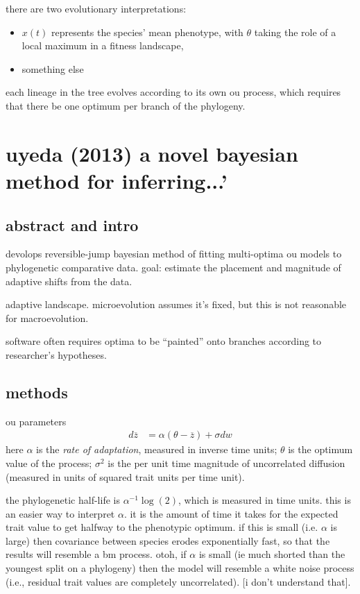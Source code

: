 \documentclass{article}
\begin{document}
there are two evolutionary interpretations:
\begin{itemize}
\item $x(t)$ represents the species' mean phenotype, with $\theta$ taking the role of a local maximum in a fitness landscape, 
\item something else
\end{itemize}
each lineage in the tree evolves according to its own ou process, which requires
that there be one optimum per branch of the phylogeny.



\section{uyeda (2013) a novel bayesian method for inferring...'}

\subsection{abstract and intro}
devolops reversible-jump bayesian method of fitting multi-optima ou models to
phylogenetic comparative data. goal: estimate the placement and magnitude of
adaptive shifts from the data.

adaptive landscape. microevolution assumes it's fixed, but this is not
reasonable for macroevolution.

software often requires optima to be ``painted'' onto branches according to
researcher's hypotheses.

\subsection{methods}

ou parameters
\begin{align*} d\overline{z} &= \alpha(\theta-\overline{z})+\sigma dw
\end{align*} here $\alpha$ is the \textit{rate of adaptation}, measured in
inverse time units; $\theta$ is the optimum value of the process; $\sigma^{2}$
is the per unit time magnitude of uncorrelated diffusion (measured in units of
squared trait units per time unit).

the phylogenetic half-life is $\alpha^{-1}\log (2)$, which is measured in time
units. this is an easier way to interpret $\alpha$. it is the amount of time it
takes for the expected trait value to get halfway to the phenotypic optimum. if
this is small (i.e. $\alpha$ is large) then covariance between species erodes
exponentially fast, so that the results will resemble a bm process. otoh, if
$\alpha$ is small (ie much shorted than the youngest split on a phylogeny) then
the model will resemble a white noise process (i.e., residual trait values are
completely uncorrelated). [i don't understand that].
\end{document}
